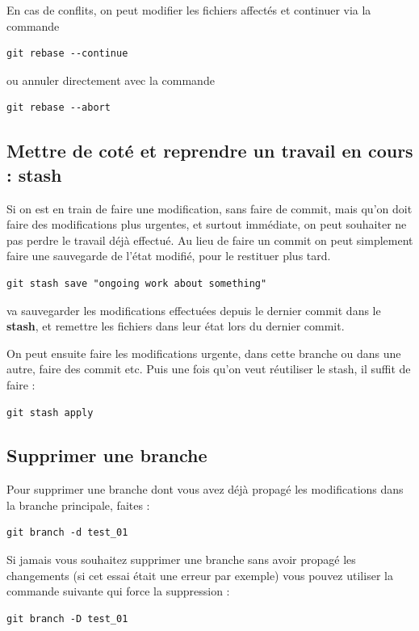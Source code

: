 \documentclass[a4paper,twoside]{article}
\begin{document}
En cas de conflits, on peut modifier les fichiers affectés et continuer via la commande 
\begin{verbatim}
git rebase --continue
\end{verbatim}
ou annuler directement avec la commande
\begin{verbatim}
git rebase --abort
\end{verbatim}

\subsection{Mettre de coté et reprendre un travail en cours : stash}
Si on est en train de faire une modification, sans faire de commit, mais qu'on doit faire des modifications plus urgentes, et surtout immédiate, on peut souhaiter ne pas perdre le travail déjà effectué. Au lieu de faire un commit on peut simplement faire une sauvegarde de l'état modifié, pour le restituer plus tard.

\begin{verbatim}
git stash save "ongoing work about something"
\end{verbatim}
va sauvegarder les modifications effectuées depuis le dernier commit dans le \textbf{stash}, et remettre les fichiers dans leur état lors du dernier commit. 

On peut ensuite faire les modifications urgente, dans cette branche ou dans une autre, faire des commit etc. Puis une fois qu'on veut réutiliser le stash, il suffit de faire : 
\begin{verbatim}
git stash apply
\end{verbatim}



\subsection{Supprimer une branche}
Pour supprimer une branche dont vous avez déjà propagé les modifications dans la branche principale, faites : 
\begin{verbatim}
git branch -d test_01
\end{verbatim}

Si jamais vous souhaitez supprimer une branche sans avoir propagé les changements (si cet essai était une erreur par exemple) vous pouvez utiliser la commande suivante qui force la suppression : 
\begin{verbatim}
git branch -D test_01
\end{verbatim}
\end{document}
